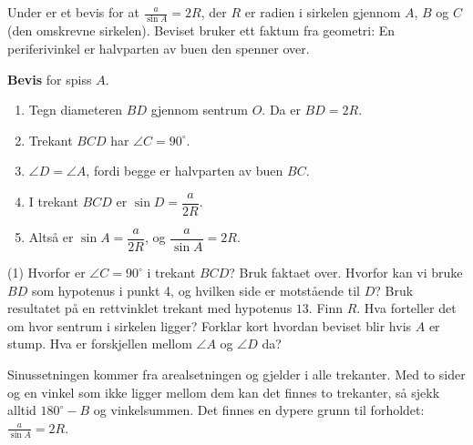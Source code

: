 Under er et bevis for at $\frac{a}{\sin A} = 2R$, der $R$ er radien i sirkelen gjennom $A$, $B$ og $C$ (den omskrevne sirkelen).
Beviset bruker ett faktum fra geometri: En periferivinkel er halvparten av buen den spenner over.

\begin{minipage}[t]{0.50\linewidth}
\textbf{Bevis} for spiss $A$.
\begin{enumerate}[leftmargin=1.5em,itemsep=1pt,topsep=2pt]
  \item Tegn diameteren $BD$ gjennom sentrum $O$. Da er $BD = 2R$.
  \item Trekant $BCD$ har $\angle C = 90^\circ$.
  \item $\angle D = \angle A$, fordi begge er halvparten av buen $BC$.
  \item I trekant $BCD$ er $\sin D = \dfrac{a}{2R}$.
  \item Altså er $\sin A = \dfrac{a}{2R}$, og $\dfrac{a}{\sin A} = 2R$.
\end{enumerate}
\end{minipage}\hfill
\begin{minipage}[t]{0.44\linewidth}
\centering
{}
\end{minipage}
\begin{tasks}(1)
  \task Hvorfor er $\angle C = 90^\circ$ i trekant $BCD$? Bruk faktaet over.
  \task Hvorfor kan vi bruke $BD$ som hypotenus i punkt 4, og hvilken side er motstående til $D$?
  \task Bruk resultatet på en rettvinklet trekant med hypotenus $13$. Finn $R$. Hva forteller det om hvor sentrum i sirkelen ligger?
  \task Forklar kort hvordan beviset blir hvis $A$ er stump. Hva er forskjellen mellom $\angle A$ og $\angle D$ da?
\end{tasks}

\begin{oppsummering}
Sinussetningen kommer fra arealsetningen og gjelder i alle trekanter. Med to sider og en vinkel som ikke ligger mellom dem kan det finnes to trekanter, så sjekk alltid $180^\circ - B$ og vinkelsummen.
Det finnes en dypere grunn til forholdet: $\frac{a}{\sin A} = 2R$.
\end{oppsummering}
